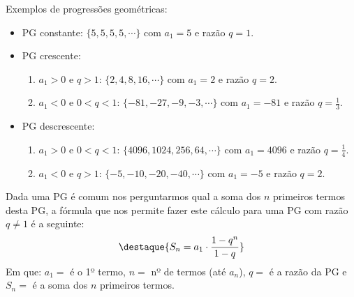 \begin{exem} Exemplos de progressões geométricas:
  \begin{itemize}
   \item PG constante: $\{5, 5, 5, 5, \cdots\}$ com $a_1= 5$ e razão $q= 1$.
   \item PG crescente:
   \begin{enumerate}
   \item $a_1 > 0$ e $q > 1$: $\{2, 4, 8, 16, \cdots\}$ com $a_1= 2$ e razão $q= 2$.
   \item $a_1 < 0$ e $0 < q < 1$: $\{-81, -27, -9, -3, \cdots\}$ com $a_1= -81$ e razão $q= \frac{1}{3}$.
   \end{enumerate}
   \item PG descrescente:
    \begin{enumerate}
   \item $a_1 > 0$ e $0 < q < 1$: $\{4096, 1024, 256, 64, \cdots\}$ com $a_1= 4096$ e razão $q= \frac{1}{4}$.
   \item $a_1 < 0$ e $q > 1$: $\{-5, -10, -20, -40, \cdots\}$ com $a_1= -5$ e razão $q= 2$.
   \end{enumerate}
  \end{itemize}
 \end{exem}
 
 Dada uma PG é comum nos perguntarmos qual a soma dos $n$ primeiros termos desta PG, a fórmula que nos permite fazer este cálculo para uma PG com razão $q \neq 1$ é a seguinte:
 \[\destaque{S_n= a_1 \cdot \frac{ 1 - q^n}{1 - q}}\]
 Em que: $a_1=$ é o 1º termo, $n=$ nº de termos (até $a_n$), $q=$ é a razão da PG e $S_n=$ é a soma dos $n$ primeiros termos.

\newpage

